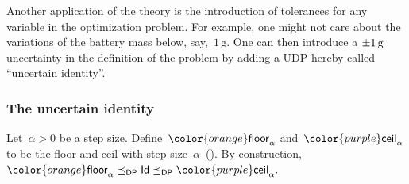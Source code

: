 \documentclass[twocolumn,english]{IEEEconf}
\theoremstyle{plain}
\theoremstyle{definition}
\theoremstyle{definition}
\theoremstyle{plain}
\newcommand{\aword}[1]{\mathsf{#1}}
\newcommand{\vmath}[1]{\aword{#1}}
\newcommand{\posleq}{\preceq}
\newcommand{\dpsp}{\vmath{DP}}
\newcommand{\dpleq}{\posleq_\dpsp}
\newcommand{\colU}{\color{purple}}
\newcommand{\colL}{\color{orange}}
\newcommand{\ufloor}{{\colL\vmath{floor}}}
\newcommand{\uceil}{{\colU\vmath{ceil}}}
\begin{document}
Another application of the theory is the introduction of tolerances
for any variable in the optimization problem. For example, one might
not care about the variations of the battery mass below, say,~$1\,\text{g}$.
One can then introduce a $\pm1\,\text{\ensuremath{\text{g}} }$ uncertainty
in the definition of the problem by adding a UDP hereby called ``uncertain
identity''. 


\subsubsection{The uncertain identity}

Let~$\alpha>0$ be a step size. Define~$\ufloor_{\alpha}$ and~$\uceil_{\alpha}$
to be the floor and ceil with step size~$\alpha$~().
By construction, $\ufloor_{\alpha}\dpleq\mathsf{Id}\dpleq\uceil_{\alpha}.$ 
\end{document}
